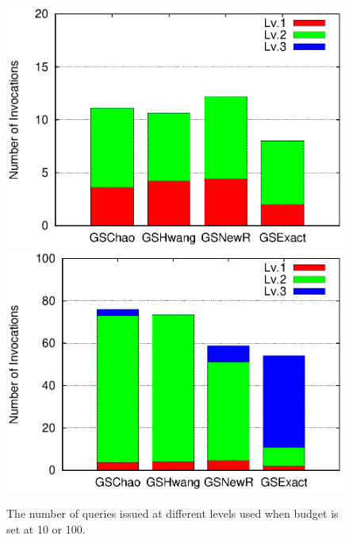 \begin{figure}[h]
    \includegraphics[clip,scale=0.32]{figs/levelBudget10.eps}
	\includegraphics[clip,scale=0.32]{figs/levelBudget100.eps}
	\caption{The number of queries issued at different levels used when budget is set at 10 or 100.}\label{fig:level}
\end{figure}

